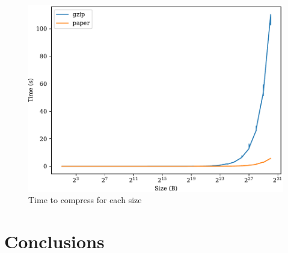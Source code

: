 \documentclass[conference,a4paper]{IEEEtran}
\begin{document}
\begin{figure}[htbp]
    \centering
    \includegraphics[width=0.95\linewidth]{../plots/time.pdf}
    \caption{Time to compress for each size}
    \label{fig:time}
\end{figure}


\section{Conclusions}



\end{document}
